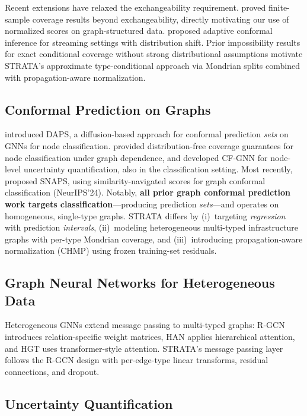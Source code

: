\documentclass[twoside,11pt]{article}
\begin{document}
Recent extensions have relaxed the exchangeability requirement.
\citet{barber2023conformal} proved finite-sample coverage results beyond
exchangeability, directly motivating our use of normalized scores on
graph-structured data. \citet{gibbs2021adaptive} proposed adaptive conformal
inference for streaming settings with distribution shift.
Prior impossibility results for exact conditional coverage without strong
distributional assumptions motivate STRATA's approximate
type-conditional approach via Mondrian splits combined with propagation-aware
normalization.

\subsection{Conformal Prediction on Graphs}

\citet{zargarbashi2023conformal} introduced DAPS, a diffusion-based approach for
conformal prediction \emph{sets} on GNNs for node classification.
\citet{clarkson2023distribution} provided distribution-free coverage guarantees
for node classification under graph dependence, and
\citet{huang2024uncertainty} developed CF-GNN for node-level uncertainty
quantification, also in the classification setting.
Most recently, \citet{song2024snaps} proposed SNAPS, using
similarity-navigated scores for graph conformal classification (NeurIPS'24).
Notably, \textbf{all prior graph conformal prediction work targets
classification}---producing prediction \emph{sets}---and operates on
homogeneous, single-type graphs.
STRATA differs by (i)~targeting \emph{regression} with prediction
\emph{intervals}, (ii)~modeling heterogeneous multi-typed infrastructure
graphs with per-type Mondrian coverage, and (iii)~introducing
propagation-aware normalization (CHMP) using frozen training-set residuals.

\subsection{Graph Neural Networks for Heterogeneous Data}

Heterogeneous GNNs extend message passing to multi-typed graphs: R-GCN
\citep{schlichtkrull2018modeling} introduces relation-specific weight matrices,
HAN \citep{wang2019heterogeneous} applies hierarchical attention, and HGT
\citep{hu2020heterogeneous} uses transformer-style attention. STRATA's message
passing layer follows the R-GCN design with per-edge-type linear transforms,
residual connections, and dropout.

\subsection{Uncertainty Quantification}
\end{document}
